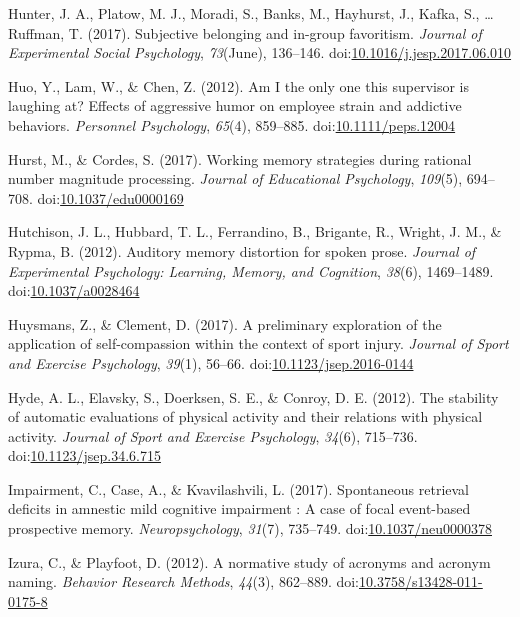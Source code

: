 \documentclass[english,man]{apa6}
\theoremstyle{definition}
\theoremstyle{definition}
\theoremstyle{definition}
\theoremstyle{remark}
\begin{document}
\hypertarget{ref-Hunter2017}{}
Hunter, J. A., Platow, M. J., Moradi, S., Banks, M., Hayhurst, J.,
Kafka, S., \ldots{} Ruffman, T. (2017). Subjective belonging and
in-group favoritism. \emph{Journal of Experimental Social Psychology},
\emph{73}(June), 136--146.
doi:\href{https://doi.org/10.1016/j.jesp.2017.06.010}{10.1016/j.jesp.2017.06.010}

\hypertarget{ref-Huo2012}{}
Huo, Y., Lam, W., \& Chen, Z. (2012). Am I the only one this supervisor
is laughing at? Effects of aggressive humor on employee strain and
addictive behaviors. \emph{Personnel Psychology}, \emph{65}(4),
859--885.
doi:\href{https://doi.org/10.1111/peps.12004}{10.1111/peps.12004}

\hypertarget{ref-Hurst2017}{}
Hurst, M., \& Cordes, S. (2017). Working memory strategies during
rational number magnitude processing. \emph{Journal of Educational
Psychology}, \emph{109}(5), 694--708.
doi:\href{https://doi.org/10.1037/edu0000169}{10.1037/edu0000169}

\hypertarget{ref-Hutchison2012}{}
Hutchison, J. L., Hubbard, T. L., Ferrandino, B., Brigante, R., Wright,
J. M., \& Rypma, B. (2012). Auditory memory distortion for spoken prose.
\emph{Journal of Experimental Psychology: Learning, Memory, and
Cognition}, \emph{38}(6), 1469--1489.
doi:\href{https://doi.org/10.1037/a0028464}{10.1037/a0028464}

\hypertarget{ref-Huysmans2017}{}
Huysmans, Z., \& Clement, D. (2017). A preliminary exploration of the
application of self-compassion within the context of sport injury.
\emph{Journal of Sport and Exercise Psychology}, \emph{39}(1), 56--66.
doi:\href{https://doi.org/10.1123/jsep.2016-0144}{10.1123/jsep.2016-0144}

\hypertarget{ref-Hyde2012}{}
Hyde, A. L., Elavsky, S., Doerksen, S. E., \& Conroy, D. E. (2012). The
stability of automatic evaluations of physical activity and their
relations with physical activity. \emph{Journal of Sport and Exercise
Psychology}, \emph{34}(6), 715--736.
doi:\href{https://doi.org/10.1123/jsep.34.6.715}{10.1123/jsep.34.6.715}

\hypertarget{ref-Impairment2017}{}
Impairment, C., Case, A., \& Kvavilashvili, L. (2017). Spontaneous
retrieval deficits in amnestic mild cognitive impairment : A case of
focal event-based prospective memory. \emph{Neuropsychology},
\emph{31}(7), 735--749.
doi:\href{https://doi.org/10.1037/neu0000378}{10.1037/neu0000378}

\hypertarget{ref-Izura2012}{}
Izura, C., \& Playfoot, D. (2012). A normative study of acronyms and
acronym naming. \emph{Behavior Research Methods}, \emph{44}(3),
862--889.
doi:\href{https://doi.org/10.3758/s13428-011-0175-8}{10.3758/s13428-011-0175-8}
\end{document}
